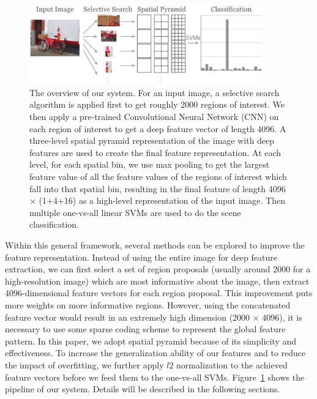 \begin{figure}[ht]
  \centering
  \includegraphics[width=0.9\textwidth]{img/overview.pdf}
  \centering
  \caption{The overview of our system. For an input image, a selective search
  algorithm is applied first to get roughly 2000 regions of interest. We then
  apply a pre-trained Convolutional Neural Network (CNN) on each region of
  interest to get a deep feature vector of length 4096. A three-level spatial
  pyramid representation of the image with deep features are used to create the
  final feature representation. At each level, for each spatial bin, we use max
  pooling to get the largest feature value of all the feature values of the
  regions of interest which fall into that spatial bin, resulting in the final
  feature of length 4096 $\times$ (1+4+16) as a high-level
  representation of the input image. Then multiple one-vs-all linear SVMs are
  used to do the scene classification.} \label{fig:system_overview}
\end{figure}

Within this general framework, several methods can be explored to improve the
feature representation. Instead of using the entire image for deep feature
extraction, we can first select a set of region proposals (usually around 2000
for a high-resolution image) which are most informative about the image, then
extract 4096-dimensional feature vectors for each region proposal. This
improvement puts more weights on more informative regions. However, using the
concatenated feature vector would result in an extremely high dimension (2000
$\times$ 4096), it is necessary to use some sparse coding scheme to represent
the global feature pattern. In this paper, we adopt spatial pyramid because of
its simplicity and effectiveness. To increase the generalization ability of our
features and to reduce the impact of overfitting, we further apply $l2$
normalization to the achieved feature vectors before we feed them to the
one-vs-all SVMs. Figure~\ref{fig:system_overview} shows the pipeline of our
system. Details will be described in the following sections.

